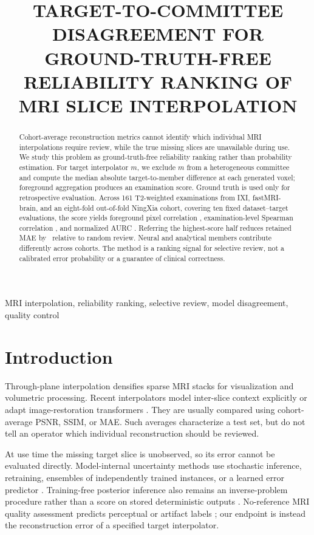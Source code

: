 \documentclass{article}
\title{TARGET-TO-COMMITTEE DISAGREEMENT FOR GROUND-TRUTH-FREE\\
RELIABILITY RANKING OF MRI SLICE INTERPOLATION}
\begin{document}
\ninept
\maketitle

\begin{abstract}
Cohort-average reconstruction metrics cannot identify which individual MRI interpolations require review, while the true missing slices are unavailable during use. We study this problem as ground-truth-free reliability ranking rather than probability estimation. For target interpolator $m$, we exclude $m$ from a heterogeneous committee and compute the median absolute target-to-member difference at each generated voxel; foreground aggregation produces an examination score. Ground truth is used only for retrospective evaluation. Across 161 T2-weighted examinations from IXI, fastMRI-brain, and an eight-fold out-of-fold NingXia cohort, covering ten fixed dataset--target evaluations, the score yields foreground pixel correlation \PixelFisherRange, examination-level Spearman correlation \CaseSpearmanRange, and normalized AURC \NAURCRange. Referring the highest-score half reduces retained MAE by \RRRFiftyRange\ relative to random review. Neural and analytical members contribute differently across cohorts. The method is a ranking signal for selective review, not a calibrated error probability or a guarantee of clinical correctness.
\end{abstract}

\begin{keywords}
MRI interpolation, reliability ranking, selective review, model disagreement, quality control
\end{keywords}

\section{Introduction}
\label{sec:intro}

Through-plane interpolation densifies sparse MRI stacks for visualization and volumetric processing. Recent interpolators model inter-slice context explicitly or adapt image-restoration transformers \cite{song2024i3net,liang2021swinir,chen2022hat}. They are usually compared using cohort-average PSNR, SSIM, or MAE. Such averages characterize a test set, but do not tell an operator which individual reconstruction should be reviewed.

At use time the missing target slice is unobserved, so its error cannot be evaluated directly. Model-internal uncertainty methods use stochastic inference, retraining, ensembles of independently trained instances, or a learned error predictor \cite{gal2016dropout,lakshminarayanan2017deepensembles,hu2021predict,kuestner2024ensembles}. Training-free posterior inference also remains an inverse-problem procedure rather than a score on stored deterministic outputs \cite{zhang2024trainingfree}. No-reference MRI quality assessment predicts perceptual or artifact labels \cite{stepien2022nriqa}; our endpoint is instead the reconstruction error of a specified target interpolator.
\end{document}
